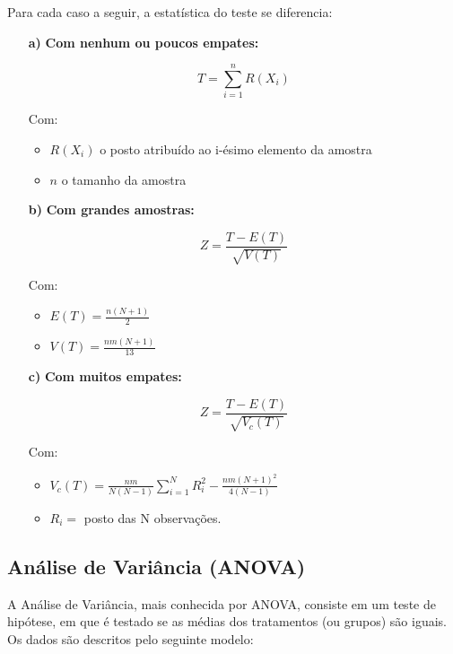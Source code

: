 \documentclass[
]{estat/estat}
\begin{document}

Para cada caso a seguir, a estatística do teste se diferencia:

\begin{itemize}
\item [\bf a)] \textbf{Com nenhum ou poucos empates:}

$$T = \sum_{i=1}^{n}R(X_{i})$$

Com:
\begin{itemize}
\item $R(X_{i})$ o posto atribuído ao i-ésimo elemento da amostra

\item $n$ o tamanho da amostra

\end{itemize}

\item [\bf b)] \textbf{Com grandes amostras:}

$$Z = \frac{T - E(T)}{\sqrt{V(T)}}$$

Com:
\begin{itemize}
\item $E(T) = \displaystyle\frac{n(N+1)}{2}$ 

\item $V(T) = \displaystyle\frac{nm(N+1)}{13}$

\end{itemize}

\item [\bf c)] \textbf{Com muitos empates:}

$$Z = \frac{T - E(T)}{\sqrt{V_{c}(T)}}$$

Com:
\begin{itemize}
\item $V_{c}(T) = \displaystyle \frac{nm}{N(N-1)}\sum_{i=1}^{N}R^{2}_{i}-\frac{nm(N+1)^{2}}{4(N-1)}$ 

\item $R_{i} = $ posto das N observações.

\end{itemize}

\end{itemize}

\subsection{Análise de Variância
(ANOVA)}\label{anuxe1lise-de-variuxe2ncia-anova}

A Análise de Variância, mais conhecida por ANOVA, consiste em um teste
de hipótese, em que é testado se as médias dos tratamentos (ou grupos)
são iguais. Os dados são descritos pelo seguinte modelo:
\end{document}

